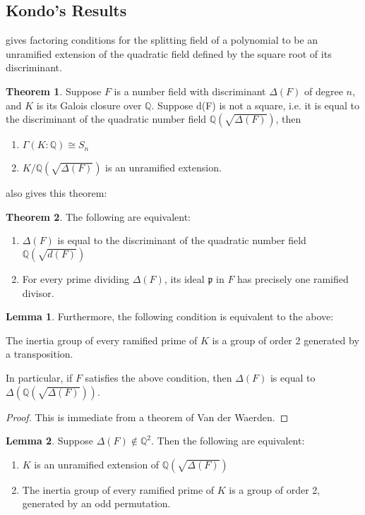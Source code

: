 \documentclass[12pt]{extarticle}
\newcommand{\Q}{\mathbb{Q}}
\newcommand{\<}{\langle}
\renewcommand{\>}{\rangle}
\theoremstyle{definition}
\newtheorem{theorem}{Theorem}
\newtheorem{lemma}{Lemma}
\begin{document}
\subsection{Kondo's Results}
\cite{KOND} gives factoring conditions for the splitting field of a polynomial to be an unramified extension of the quadratic field defined by the square root of its discriminant.
\begin{theorem}
    Suppose $F$ is a number field with discriminant $\Delta(F)$ of degree $n$, and $K$ is its Galois closure over $\mathbb{Q}$. Suppose d(F) is not a square, i.e. it is equal to the discriminant of the quadratic number field $\Q(\sqrt{\Delta(F)})$, then \begin{enumerate}
        \item $\Gamma(K:\Q)\cong S_n$
        \item $K/\Q(\sqrt{\Delta(F)})$ is an unramified extension.
    \end{enumerate}
\end{theorem}
\cite{KOND} also gives this theorem: \begin{theorem}
    The following are equivalent: \begin{enumerate}
        \item $\Delta(F)$ is equal to the discriminant of the quadratic number field $\Q(\sqrt{d(F)})$
        \item For every prime dividing $\Delta(F)$, its ideal $\mathfrak{p}$ in $F$ has precisely one ramified divisor.
    \end{enumerate}
\end{theorem}
\begin{lemma}
Furthermore, the following condition is equivalent to the above:
\par
    The inertia group of every ramified prime of $K$ is a group of order 2 generated by a transposition.\par
In particular, if $F$ satisfies the above condition, then $\Delta(F)$ is equal to $\Delta(\Q(\sqrt{\Delta(F)}))$.
\end{lemma}
\begin{proof}
This is immediate from a theorem of Van der Waerden. 
\end{proof}
\begin{lemma}
Suppose $\Delta(F)\notin \Q^2$. Then the following are equivalent:\begin{enumerate}
    \item $K$ is an unramified extension of $\Q(\sqrt{\Delta(F)})$
    \item The inertia group of every ramified prime of $K$ is a group of order 2, generated by an odd permutation. 
\end{enumerate}
\end{lemma} 
\end{document}
